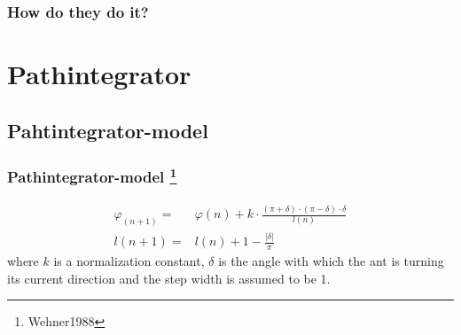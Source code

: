 \documentclass[ignorenonframetext]{beamer}
\begin{document}
\begin{frame} 
\frametitle{How do they do it?} 
\begin{center} 
% 
%

\end{center} 
\end{frame} 


\section{Pathintegrator}



\subsection{Pahtintegrator-model}
\begin{frame}
\frametitle{Pathintegrator-model \footnote{Wehner1988}}
\begin{align*}
\varphi_(n+1) =& \varphi(n) +k \cdot \frac{(\pi +\delta)\cdot(\pi-\delta)\cdot \delta}{l(n)}\\
l(n+1) =& l(n) +1 -\frac{|\delta|}{\pi}
\end{align*}
where $k$ is a normalization constant, $\delta$ is the angle with which the ant is turning its current direction and the step width is assumed to be 1.







\end{frame}
\end{document}
